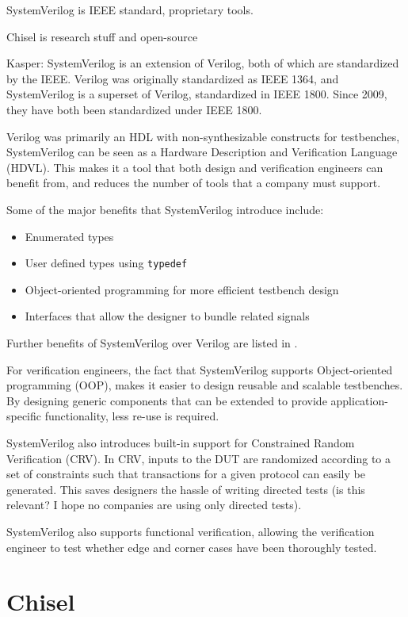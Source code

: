 \documentclass[a4paper, conference]{IEEEtran}
\newcommand{\kasper}[1]{{\color{purple} Kasper: #1}}
\begin{document}
SystemVerilog is IEEE standard, proprietary tools.

Chisel is research stuff and open-source

\kasper{
SystemVerilog is an extension of Verilog, both of which are standardized by the IEEE. Verilog was originally standardized as IEEE 1364, and SystemVerilog is a superset of Verilog, standardized in IEEE 1800. Since 2009, they have both been standardized under IEEE 1800. 

Verilog was primarily an HDL with non-synthesizable constructs for testbenches, SystemVerilog can be seen as a Hardware Description and Verification Language (HDVL). This makes it a tool that both design and verification engineers can benefit from, and reduces the number of tools that a company must support. 

Some of the major benefits that SystemVerilog introduce include: 
\begin{itemize}
    \item Enumerated types
    \item User defined types using \texttt{typedef}
    \item Object-oriented programming for more efficient testbench design
    \item Interfaces that allow the designer to bundle related signals
\end{itemize}
Further benefits of SystemVerilog over Verilog are listed in \cite{Sutherland2010}.

For verification engineers, the fact that SystemVerilog supports Object-oriented programming (OOP), makes it easier to design reusable and scalable testbenches. By designing generic components that can be extended to provide application-specific functionality, less re-use is required.

SystemVerilog also introduces built-in support for Constrained Random Verification (CRV). In CRV, inputs to the DUT are randomized according to a set of constraints such that transactions for a given protocol can easily be generated. This saves designers the hassle of writing directed tests (is this relevant? I hope no companies are using only directed tests).

SystemVerilog also supports functional verification, allowing the verification engineer to test whether edge and corner cases have been thoroughly tested. 
}

\section{Chisel}
\end{document}
